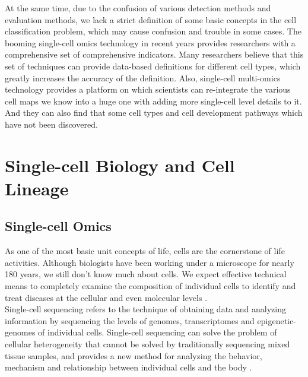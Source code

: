 At the same time, due to the confusion of various detection methods and evaluation methods, we lack a strict definition of some basic concepts in the cell classification problem, which may cause confusion and trouble in some cases. The booming single-cell omics technology in recent years provides researchers with a comprehensive set of comprehensive indicators. Many researchers believe that this set of techniques can provide data-based definitions for different cell types, which greatly increases the accuracy of the definition. Also, single-cell multi-omics technology provides a platform on which scientists can re-integrate the various cell maps we know into a huge one with adding more single-cell level details to it. And they can also find that some cell types and cell development pathways which have not been discovered. 

\section{Single-cell Biology and Cell Lineage}

\subsection{Single-cell Omics}

As one of the most basic unit concepts of life, cells are the cornerstone of life activities. Although biologists have been working under a microscope for nearly 180 years, we still don't know much about cells. We expect effective technical means to completely examine the composition of individual cells to identify and treat diseases at the cellular and even molecular levels \parencite{noauthor_single-cell_2017, perkel_single-cell_2017}. \\

Single-cell sequencing refers to the technique of obtaining data and analyzing information by sequencing the levels of genomes, transcriptomes and epigenetic-genomes of individual cells. Single-cell sequencing can solve the problem of cellular heterogeneity that cannot be solved by traditionally sequencing mixed tissue samples, and provides a new method for analyzing the behavior, mechanism and relationship between individual cells and the body 
\parencite{perkel_single-cell_2017,regev_human_2017}. \\

